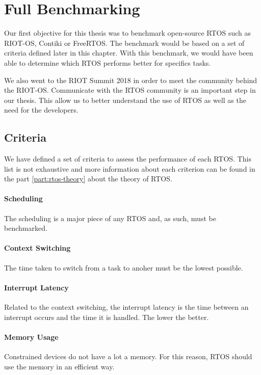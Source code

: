 \section{Full Benchmarking}

Our first objective for this thesis was to benchmark open-source RTOS such as RIOT-OS, Contiki or FreeRTOS.
The benchmark would be based on a set of criteria defined later in this chapter.
With this benchmark, we would have been able to determine which RTOS performs better for specifics tasks.

We also went to the RIOT Summit 2018 in order to meet the community behind the RIOT-OS.
Communicate with the RTOS community is an important step in our thesis.
This allow us to better understand the use of RTOS as well as the need for the developers.

\subsection{Criteria}
We have defined a set of criteria to assess the performance of each RTOS.
This list is not exhaustive and more information about each criterion can be found in the part \ref{part:rtos-theory} about the theory of RTOS.

\paragraph{Scheduling}
The scheduling is a major piece of any RTOS and, as such, must be benchmarked.

\paragraph{Context Switching}
The time taken to switch from a task to anoher must be the lowest possible.

\paragraph{Interrupt Latency}
Related to the context switching, the interrupt latency is the time between an interrupt occurs and the time it is handled.
The lower the better.

\paragraph{Memory Usage}
Constrained devices do not have a lot a memory.
For this reason, RTOS should use the memory in an efficient way.

